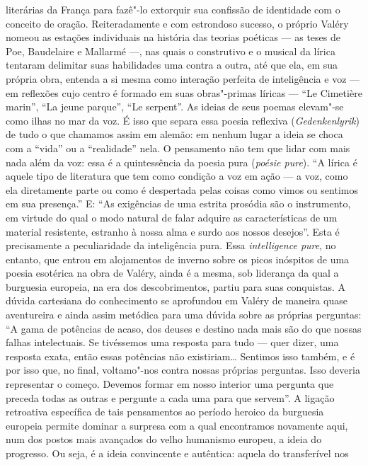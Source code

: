 literárias da França para fazê"-lo extorquir sua confissão de identidade
com o conceito de oração. Reiteradamente e com estrondoso sucesso, o
próprio Valéry nomeou as estações individuais na história das teorias
poéticas --- as teses de Poe, Baudelaire e Mallarmé ---, nas quais o
construtivo e o musical da lírica tentaram delimitar suas habilidades
uma contra a outra, até que ela, em sua própria obra, entenda a si mesma
como interação perfeita de inteligência e voz --- em reflexões cujo centro
é formado em suas obras"-primas líricas --- ``Le Cimetière marin'', ``La jeune
parque'', ``Le serpent''. As ideias de seus poemas elevam"-se como ilhas no
mar da voz. É isso que separa essa poesia reflexiva
(\emph{Gedenkenlyrik}) de tudo o que chamamos assim em alemão: em nenhum
lugar a ideia se choca com a ``vida'' ou a ``realidade'' nela. O pensamento
não tem que lidar com mais nada além da voz: essa é a quintessência da
poesia pura (\emph{poésie pure}). ``A lírica é aquele tipo de literatura
que tem como condição a voz em ação --- a voz, como ela diretamente parte
ou como é despertada pelas coisas como vimos ou sentimos em sua
presença.'' E: ``As exigências de uma estrita prosódia são o instrumento, em
virtude do qual o modo natural de falar adquire as características de um
material resistente, estranho à nossa alma e surdo aos nossos desejos''.
Esta é precisamente a peculiaridade da inteligência pura. Essa
\emph{intelligence pure}, no entanto, que entrou em alojamentos de
inverno sobre os picos inóspitos de uma poesia esotérica na obra de
Valéry, ainda é a mesma, sob liderança da qual a burguesia europeia, na
era dos descobrimentos, partiu para suas conquistas. A dúvida cartesiana
do conhecimento se aprofundou em Valéry de maneira quase aventureira e
ainda assim metódica para uma dúvida sobre as próprias perguntas: ``A
gama de potências de acaso, dos deuses e destino nada mais são do que
nossas falhas intelectuais. Se tivéssemos uma resposta para tudo ---
quer dizer, uma resposta exata, então essas potências não existiriam\ldots{}
Sentimos isso também, e é por isso que, no final, voltamo"-nos contra
nossas próprias perguntas. Isso deveria representar o começo. Devemos
formar em nosso interior uma pergunta que preceda todas as outras e
pergunte a cada uma para que servem''. A ligação retroativa específica
de tais pensamentos ao período heroico da burguesia europeia permite
dominar a surpresa com a qual encontramos novamente aqui, num dos postos
mais avançados do velho humanismo europeu, a ideia do progresso. Ou
seja, é a ideia convincente e autêntica: aquela do transferível nos
